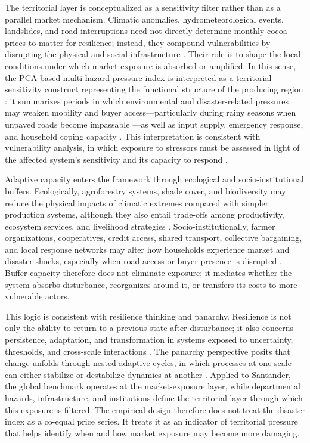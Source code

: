 \documentclass[11pt]{article}
\begin{document}
The territorial layer is conceptualized as a sensitivity filter rather than as a parallel market mechanism. Climatic anomalies, hydrometeorological events, landslides, and road interruptions need not directly determine monthly cocoa prices to matter for resilience; instead, they compound vulnerabilities by disrupting the physical and social infrastructure \citep{Morales2022}. Their role is to shape the local conditions under which market exposure is absorbed or amplified. In this sense, the PCA-based multi-hazard pressure index is interpreted as a territorial sensitivity construct representing the functional structure of the producing region \citep[consistent with][]{multihazard2022}: it summarizes periods in which environmental and disaster-related pressures may weaken mobility and buyer access---particularly during rainy seasons when unpaved roads become impassable \citep{TsowouGayi2019, Gatto2021}---as well as input supply, emergency response, and household coping capacity \citep{Hussain2016, Jones2016}. This interpretation is consistent with vulnerability analysis, in which exposure to stressors must be assessed in light of the affected system's sensitivity and its capacity to respond \citep{Turner2003,Adger2006}.



Adaptive capacity enters the framework through ecological and socio-institutional buffers. Ecologically, agroforestry systems, shade cover, and biodiversity may reduce the physical impacts of climatic extremes compared with simpler production systems, although they also entail trade-offs among productivity, ecosystem services, and livelihood strategies \citep{VaastSomarriba2014,Schroth2016,Niether2020}. Socio-institutionally, farmer organizations, cooperatives, credit access, shared transport, collective bargaining, and local response networks may alter how households experience market and disaster shocks, especially when road access or buyer presence is disrupted \citep{Jacobi2014,Mithofer2017}. Buffer capacity therefore does not eliminate exposure; it mediates whether the system absorbs disturbance, reorganizes around it, or transfers its costs to more vulnerable actors.

This logic is consistent with resilience thinking and panarchy. Resilience is not only the ability to return to a previous state after disturbance; it also concerns persistence, adaptation, and transformation in systems exposed to uncertainty, thresholds, and cross-scale interactions \citep{Folke2006}. The panarchy perspective posits that change unfolds through nested adaptive cycles, in which processes at one scale can either stabilize or destabilize dynamics at another \citep{GundersonHolling2002}. Applied to Santander, the global benchmark operates at the market-exposure layer, while departmental hazards, infrastructure, and institutions define the territorial layer through which this exposure is filtered. The empirical design therefore does not treat the disaster index as a co-equal price series. It treats it as an indicator of territorial pressure that helps identify when and how market exposure may become more damaging.
\end{document}
